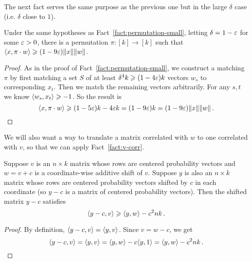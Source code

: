 The next fact serves the same purpose as the previous one but in the large $\delta$ case (i.e. $\delta$ close to $1$).
\begin{fact}
\label{fact:permutation-large}
  Under the same hypotheses as Fact~\ref{fact:permutation-small}, letting $\delta = 1 - \varepsilon$ for some $\varepsilon > 0$, there is a permutation $\pi : [k]  \rightarrow [k]$ such that $\langle x,\pi \cdot w\rangle \geqslant (1 - 9\varepsilon) \|x\|\|w\|$.
\end{fact}
\begin{proof}
  As in the proof of Fact~\ref{fact:permutation-small}, we construct a matching $\pi$ by first matching a set $S$ of at least $\delta^4k \geqslant (1 - 4\varepsilon)k$ vectors $w_s$ to corresponding $x_t$.
  Then we match the remaining vectors arbitrarily.
  For any $s,t$ we know $\langle w_s,x_t\rangle \geqslant -1$.
  So the result is
  \[
  \langle x, \pi \cdot w\rangle \geqslant (1 - 5 \varepsilon) k - 4 \varepsilon k = (1 - 9 \varepsilon) k = (1 - 9\varepsilon) \|x\|\|w\|\,.\qedhere
  \]
\end{proof}

We will also want a way to translate a matrix correlated with $w$ to one correlated with $v$, so that we can apply Fact~\ref{fact:v-corr}.
\begin{fact}
  \label{fact:shift-1}
  Suppose $v$ is an $n \times k$ matrix whose rows are centered probability vectors and $w = v + c$ is a coordinate-wise additive shift of $v$.
  Suppose $y$ is also an $n \times k$ matrix whose rows are centered probability vectors shifted by $c$ in each coordinate (so $y - c$ is a matrix of centered probability vectors).
  Then the shifted matrix $y-c$ satisfies
  \[
    \langle y-c,v\rangle \geqslant \langle y,w\rangle - c^2 nk\,.
  \]
\end{fact}
\begin{proof}
  By definition, $\langle y -c,v\rangle = \langle y,v\rangle$. Since $v = w -c$, we get
  \[
    \langle y-c,v\rangle = \langle y,v\rangle = \langle y,w\rangle - c \langle y, 1\rangle = \langle y,w\rangle - c^2 nk\,.\qedhere
  \]
\end{proof}

